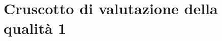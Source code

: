 

\appendix %


\section{Cruscotto di valutazione della qualità 1}
\label{sec:Cruscotto di valutazione della qualità 1}